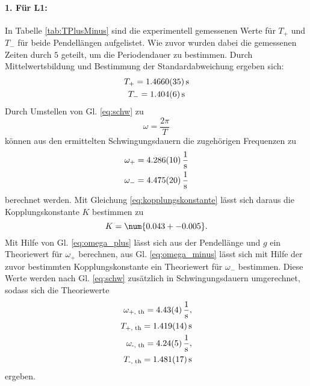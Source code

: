 \paragraph{1. Für L1:}
In Tabelle \ref{tab:TPlusMinus} sind die experimentell gemessenen Werte für $T_+$ und $T_-$ für beide Pendellängen aufgelistet.
Wie zuvor wurden dabei die gemessenen Zeiten durch $5$ geteilt, um die Periodendauer zu bestimmen. Durch Mittelwertsbildung und Bestimmung der
Standardabweichung ergeben sich:
\begin{gather*}
    T_+ = \SI{1.4660 +- 0.0035}{s} \\
    T_- = \SI{1.404 +- 0.006}{s}
\end{gather*}
Durch Umstellen von Gl. \eqref{eq:schw} zu
\begin{equation}
    \label{eq:frequenz}
    \omega = \frac{2 \pi}{T}
\end{equation}
können aus den ermittelten Schwingungsdauern die zugehörigen Frequenzen zu
\begin{align*}
    \omega_+ = \SI{4.286 +- 0.010}{\frac{1}{s}} \\
    \omega_- = \SI{4.475 +- 0.020}{\frac{1}{s}} 
\end{align*}
berechnet werden.
Mit Gleichung \eqref{eq:kopplungskonstante} lässt sich daraus die Kopplungskonstante $K$ bestimmen zu 
\begin{equation*}
    K = \num{0.043 +- 0.005} .
\end{equation*}
Mit Hilfe von Gl. \eqref{eq:omega_plus} lässt sich aus der Pendellänge und $g$ ein Theoriewert für $\omega_+$ berechnen, aus Gl. \eqref{eq:omega_minus} lässt sich mit Hilfe der zuvor
bestimmten Kopplungskonstante ein Theoriewert für $\omega_-$ bestimmen. Diese Werte werden nach Gl. \eqref{eq:schw} zusätzlich in Schwingungsdauern umgerechnet, sodass sich die Theoriewerte
\begin{align*}
    \omega_\text{+, th} = \SI{4.43 +- 0.04}{\frac{1}{s}} , \\
    T_\text{+, th} = \SI{1.419 +- 0.014}{s} \\
    \omega_\text{-, th} = \SI{4.24 +- 0.05}{\frac{1}{s}} , \\
    T_\text{-, th} = \SI{1.481 +- 0.017}{s} 
\end{align*}
ergeben.

